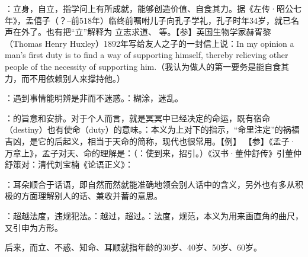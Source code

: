 {
\begin{lyitemize}
\item {}：立身，自立，指学问上有所成就，能够创造价值、自食其力。据《左传·昭公七年》，孟僖子（？--前518年）临终前嘱咐儿子向孔子学礼，孔子时年34岁，就已名声在外了。也有把“立”解释为  立志求道、 等。【参】英国生物学家赫胥黎（Thomas Henry Huxley）1892年写给友人之子的一封信上说：In my opinion a man's first duty is to find a way of supporting himself, thereby relieving other people of the necessity of supporting him.（我认为做人的第一要务是能自食其力，而不用依赖别人来撑持他。）
\item {}：遇到事情能明辨是非而不迷惑。：糊涂，迷乱。

\item {}：的旨意和安排。对于个人而言，就是冥冥中已经决定的命运，既有宿命（destiny）也有使命（duty）的意味。：本义为上对下的指示，“命里注定”的祸福吉凶，是它的后起义，相当于天命的简称，现代也很常用。【例】 【参】《孟子·万章上》，孟子对天、命的理解是：（：使到来，招引。）《汉书·董仲舒传》引董仲舒策对：清代刘宝楠《论语正义》：
\item {}：耳朵顺合于话语，即自然而然就能准确地领会别人话中的含义，另外也有多从积极的方面理解别人的话、兼收并蓄的意思。
\item {}：超越法度，违规犯法。：越过，超过。：法度，规范，本义为用来画直角的曲尺，又引申为方形。
\end{lyitemize}
后来，而立、不惑、知命、耳顺就指年龄的30岁、40岁、50岁、60岁。
}
{} %


